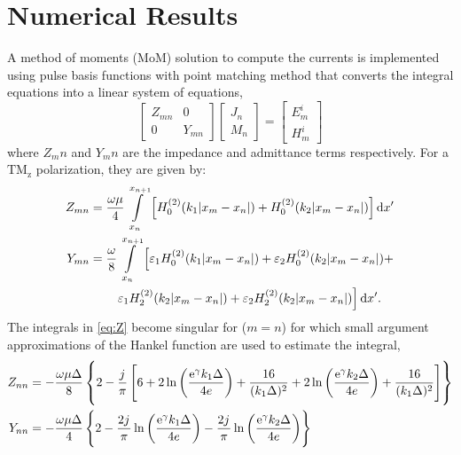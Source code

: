 \documentclass[12pt]{article}
\begin{document}
\section{Numerical Results}
%
A method of moments (MoM) solution to compute the currents is implemented using pulse basis functions with point matching method \cite{Harrington1993} that converts the integral equations into a linear system of equations,
%
\begin{equation}
\begin{bmatrix}
  Z_{mn}   & 0 \\
  0        & Y_{mn}
\end{bmatrix}
\begin{bmatrix}
  J_n \\
  M_n
\end{bmatrix}
=
\begin{bmatrix}
  E_m^i \\
  H_m^i
\end{bmatrix}
\label{eq:MOM}
\end{equation}
%
where $Z_mn$ and $Y_mn$ are the impedance and admittance terms respectively. For a $\mathrm{TM_z}$ polarization, they are given by:
%
\begin{subequations}
  \begin{align}
    Z_{mn} &= \frac{\omega \mu}{4} \int \limits_{x_n}^{x_{n+1}}  \left[ H_0^{(2)}(k_1 |x_m - x_n|) +  H_0^{(2)}(k_2 |x_m - x_n|) \right]\mathop{}\!\mathrm{d}{x'}
    \label{eq:Z_J}\\
    Y_{mn} &= \frac{\omega}{8} \int \limits_{x_n}^{x_{n+1}}  \left[ \varepsilon_1 H_0^{(2)}(k_1 |x_m - x_n|) +  \varepsilon_2 H_0^{(2)}(k_2 |x_m - x_n|) +  \right.\notag\\
    & \qquad \left. \varepsilon_1 H_2^{(2)}(k_2 |x_m - x_n|) + \varepsilon_2 H_2^{(2)}(k_2 |x_m - x_n|) \right]\mathop{}\!\mathrm{d}{x'}.
    \label{eq:Y_M}
  \end{align}
  \label{eq:Z}%
\end{subequations}%
%
The integrals in \eqref{eq:Z} become singular for ($m = n$) for which small argument approximations of the Hankel function are used to estimate the integral,
%
\begin{subequations}
  \begin{align}
    Z_{nn} &=  -\frac{\omega \mu \Delta}{8} \left\{
    2 -\frac{{j}\mkern1mu}{\pi} \left[ 6 + 2 \ln \left(\frac{\mathrm{e}^{\gamma} k_1 \Delta}{4 e}\right) + \frac{16}{(k_1 \Delta)^2} + 2 \ln \left(\frac{ \mathrm{e}^{\gamma} k_2 \Delta}{4 e}\right) + \frac{16}{(k_1 \Delta)^2} \right]   \right\}
    \label{eq:Z_self}\\
    Y_{nn} &= -\frac{\omega \mu \Delta}{4} \left\{ 2 -\frac{2 {j}\mkern1mu}{\pi}\ln \left(\frac{\mathrm{e}^{\gamma} k_1 \Delta}{4 e}\right) -
    \frac{2 {j}\mkern1mu}{\pi}\ln \left(\frac{\mathrm{e}^{\gamma} k_2 \Delta}{4 e}
    \right)
    \right\}
    \label{eq:Y_self}
  \end{align}
  \label{eq:Zself}%
\end{subequations}%
%
\end{document}
